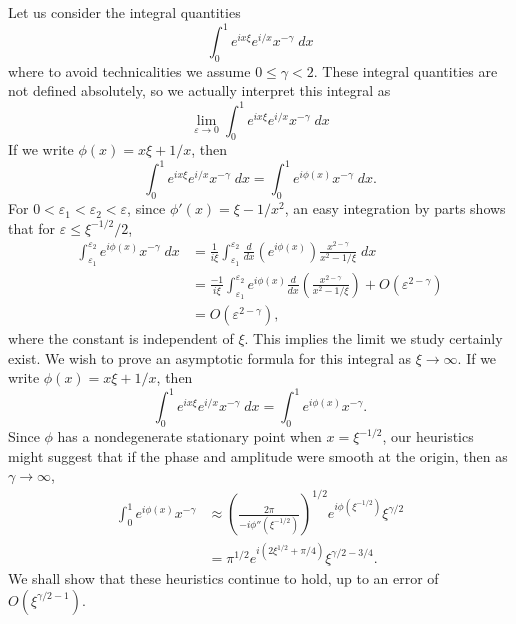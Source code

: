 \begin{example}
  Let us consider the integral quantities
  \[ \int_0^1 e^{i x \xi} e^{i/x} x^{-\gamma}\; dx \]
  where to avoid technicalities we assume $0 \leq \gamma < 2$. These integral quantities are not defined absolutely, so we actually interpret this integral as
  \[ \lim_{\varepsilon \to 0} \int_0^1 e^{i x \xi} e^{i/x} x^{-\gamma}\; dx \]
  If we write $\phi(x) = x \xi + 1/x$, then
  \[ \int_0^1 e^{i x \xi} e^{i/x} x^{-\gamma}\; dx = \int_0^1 e^{i\phi(x)} x^{-\gamma}\; dx. \]
  For $0 < \varepsilon_1 < \varepsilon_2 < \varepsilon$, since $\phi'(x) = \xi - 1/x^2$, an easy integration by parts shows that for $\varepsilon \leq \xi^{-1/2}/2$,
  \begin{equation} \label{riemannsingularityibp}
  \begin{aligned}
    \int_{\varepsilon_1}^{\varepsilon_2} e^{i\phi(x)} x^{-\gamma}\; dx &= \frac{1}{i \xi} \int_{\varepsilon_1}^{\varepsilon_2} \frac{d}{dx} \left( e^{i \phi(x)} \right) \frac{x^{2-\gamma}}{x^2 - 1/\xi}\; dx\\
    &= \frac{-1}{i \xi} \int_{\varepsilon_1}^{\varepsilon_2} e^{i \phi(x)} \frac{d}{dx} \left( \frac{x^{2-\gamma}}{x^2 - 1/\xi} \right) + O(\varepsilon^{2-\gamma})\\
    &= O(\varepsilon^{2-\gamma}),
  \end{aligned}
  \end{equation}
  where the constant is independent of $\xi$. This implies the limit we study certainly exist. We wish to prove an asymptotic formula for this integral as $\xi \to \infty$. If we write $\phi(x) = x \xi + 1/x$, then
  \[ \int_0^1 e^{i x \xi} e^{i/x} x^{-\gamma}\; dx = \int_0^1 e^{i \phi(x)} x^{-\gamma}. \]
  Since $\phi$ has a nondegenerate stationary point when $x = \xi^{-1/2}$, our heuristics might suggest that if the phase and amplitude were smooth at the origin, then as $\gamma \to \infty$,
  \begin{align*}
    \int_0^1 e^{i\phi(x)} x^{-\gamma} &\approx \left( \frac{2\pi}{-i \phi''(\xi^{-1/2})} \right)^{1/2} e^{i\phi(\xi^{-1/2})} \xi^{\gamma/2}\\
    &= \pi^{1/2} e^{i(2 \xi^{1/2} + \pi/4)} \xi^{\gamma/2 - 3/4}.
  \end{align*}
  We shall show that these heuristics continue to hold, up to an error of $O(\xi^{\gamma/2 - 1})$.


\end{example}
